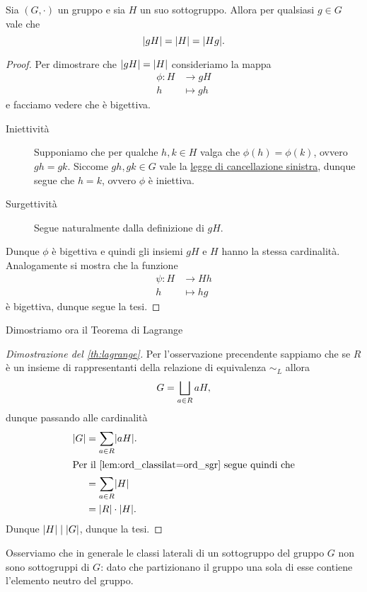 \begin{lemma}\label{lem:ord_classilat=ord_sgr}
    Sia $(G, \cdot)$ un gruppo e sia $H$ un suo sottogruppo. Allora per qualsiasi $g \in G$ vale che \[
        \abs*{gH} = \abs*{H} = \abs*{Hg}.     
    \]
\end{lemma}
\begin{proof}
    Per dimostrare che $\abs*{gH} = \abs*{H}$ consideriamo la mappa \begin{align*}
        \phi : H &\to gH \\   
        h &\mapsto gh 
    \end{align*} e facciamo vedere che è bigettiva.
    \begin{description}
        \item[Iniettività] Supponiamo che per qualche $h, k \in H$ valga che $\phi(h) = \phi(k)$, ovvero $gh = gk$. Siccome $gh, gk \in G$ vale la \hyperref[prop:prop_grp:canc:sx]{legge di cancellazione sinistra}, dunque segue che $h = k$, ovvero $\phi$ è iniettiva.
        \item[Surgettività] Segue naturalmente dalla definizione di $gH$. 
    \end{description}
    Dunque $\phi$ è bigettiva e quindi gli insiemi $gH$ e $H$ hanno la stessa cardinalità. Analogamente si mostra che la funzione \begin{align*}
        \psi : H &\to Hh \\   
        h &\mapsto hg 
    \end{align*} è bigettiva, dunque segue la tesi.
\end{proof}

Dimostriamo ora il Teorema di Lagrange
\begin{proof}[Dimostrazione del \autoref{th:lagrange}]
    Per l'osservazione precendente sappiamo che se $R$ è un insieme di rappresentanti della relazione di equivalenza $\sim_L$ allora \[
        G = \bigdisjunion_{a \in R} aH,
    \] dunque passando alle cardinalità \begin{align*}
        \abs*{G} &= \sum_{a \in R} \abs*{aH}.  \\
        \intertext{Per il \autoref{lem:ord_classilat=ord_sgr} segue quindi che}  
        &= \sum_{a \in R} \abs*{H}\\
        &= \abs*{R}\cdot \abs*{H}. 
    \end{align*}  Dunque $\abs*{H} \divides \abs*{G}$, dunque la tesi.
\end{proof}

\begin{remark}
    Osserviamo che in generale le classi laterali di un sottogruppo del gruppo $G$ non sono sottogruppi di $G$: dato che partizionano il gruppo una sola di esse contiene l'elemento neutro del gruppo.
\end{remark}


